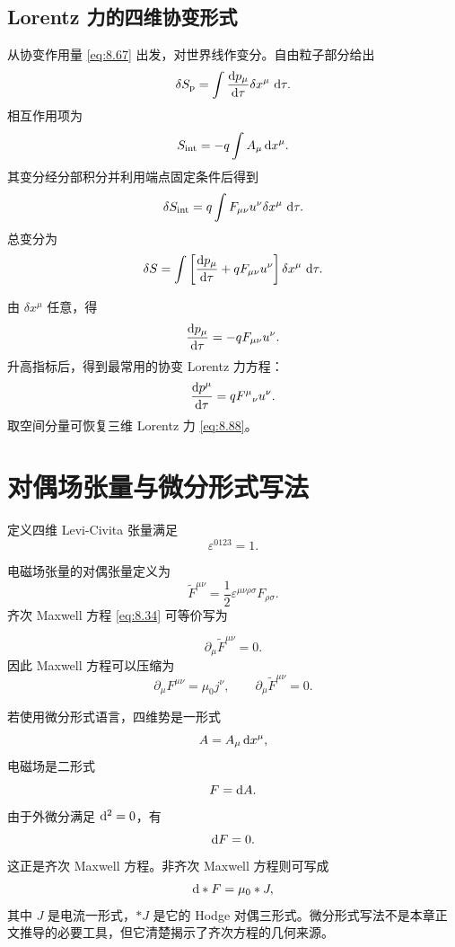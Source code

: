 \subsection{Lorentz 力的四维协变形式}

从协变作用量 \eqref{eq:8.67} 出发，对世界线作变分。自由粒子部分给出
\[
\delta S_{\mathrm{p}}
=
\int
\frac{\mathop{}\!\mathrm{d} p_{\mu}}{\mathop{}\!\mathrm{d}\tau}\delta x^{\mu}\,\mathop{}\!\mathrm{d}\tau.
\]
相互作用项为
\[
S_{\mathrm{int}}
=
-q\int A_{\mu}\mathop{}\!\mathrm{d} x^{\mu}.
\]
其变分经分部积分并利用端点固定条件后得到
\[
\delta S_{\mathrm{int}}
=
q\int F_{\mu\nu}u^{\nu}\delta x^{\mu}\,\mathop{}\!\mathrm{d}\tau.
\]
总变分为
\[
\delta S
=
\int
\left[
\frac{\mathop{}\!\mathrm{d} p_{\mu}}{\mathop{}\!\mathrm{d}\tau}
+
qF_{\mu\nu}u^{\nu}
\right]
\delta x^{\mu}\,\mathop{}\!\mathrm{d}\tau.
\]

由 $\delta x^{\mu}$ 任意，得
\begin{equation}
	\frac{\mathop{}\!\mathrm{d} p_{\mu}}{\mathop{}\!\mathrm{d}\tau}
	=
	-qF_{\mu\nu}u^{\nu}.
	\label{eq:8.94}
\end{equation}
升高指标后，得到最常用的协变 Lorentz 力方程：
\begin{equation}
	\frac{\mathop{}\!\mathrm{d} p^{\mu}}{\mathop{}\!\mathrm{d}\tau}
	=
	qF^{\mu}{}_{\nu}u^{\nu}.
	\label{eq:8.95}
\end{equation}
取空间分量可恢复三维 Lorentz 力 \eqref{eq:8.88}。

\section{对偶场张量与微分形式写法}

定义四维 Levi-Civita 张量满足
\[
\varepsilon^{0123}=1.
\]

电磁场张量的对偶张量定义为
\begin{equation}
	\widetilde{F}^{\mu\nu}
	=
	\frac{1}{2}\varepsilon^{\mu\nu\rho\sigma}F_{\rho\sigma}.
	\label{eq:8.97}
\end{equation}
齐次 Maxwell 方程 \eqref{eq:8.34} 可等价写为

\[
\partial_{\mu}\widetilde{F}^{\mu\nu}=0.
\]
因此 Maxwell 方程可以压缩为
\begin{equation}
	\partial_{\mu}F^{\mu\nu}=\mu_{0}j^{\nu},
	\qquad
	\partial_{\mu}\widetilde{F}^{\mu\nu}=0.
	\label{eq:8.99}
\end{equation}

若使用微分形式语言，四维势是一形式
\[
A=A_{\mu}\mathop{}\!\mathrm{d} x^{\mu},
\]
电磁场是二形式
\begin{equation}
	F=\mathop{}\!\mathrm{d} A.
	\label{eq:8.101}
\end{equation}
由于外微分满足 $\mathop{}\!\mathrm{d}^{2}=0$，有
\begin{equation}
	\mathop{}\!\mathrm{d} F=0.
	\label{eq:8.102}
\end{equation}
这正是齐次 Maxwell 方程。非齐次 Maxwell 方程则可写成
\begin{equation}
	\mathop{}\!\mathrm{d} *F=\mu_{0}*J,
	\label{eq:8.103}
\end{equation}
其中 $J$ 是电流一形式，$*J$ 是它的 Hodge 对偶三形式。微分形式写法不是本章正文推导的必要工具，但它清楚揭示了齐次方程的几何来源。

